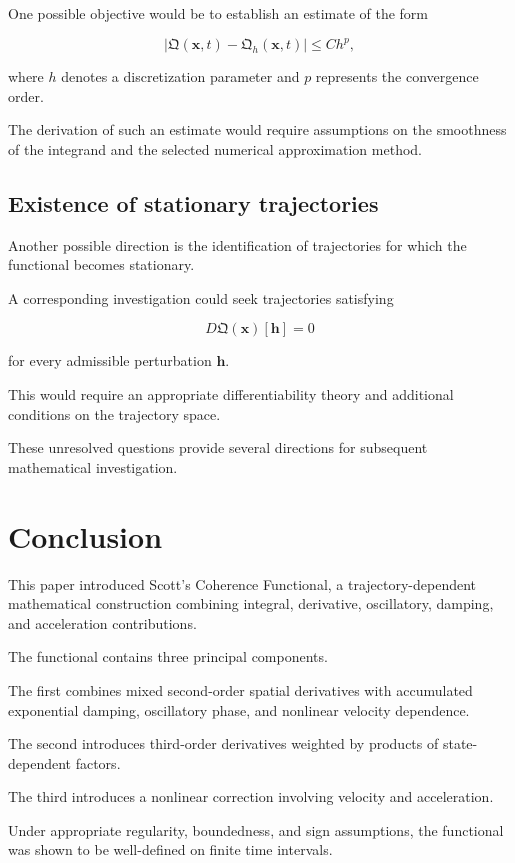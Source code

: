 \documentclass[12pt]{article}
\numberwithin{equation}{section}
\newcommand{\Q}{\mathfrak{Q}}
\theoremstyle{definition}
\theoremstyle{remark}
\begin{document}
One possible objective would be to establish
an estimate of the form

\[
|\Q(\mathbf{x},t)-\Q_h(\mathbf{x},t)|
\leq Ch^p,
\]

where \(h\) denotes a discretization
parameter and \(p\) represents the
convergence order.

The derivation of such an estimate would
require assumptions on the smoothness
of the integrand and the selected
numerical approximation method.

\subsection{Existence of stationary trajectories}

Another possible direction is the
identification of trajectories for which
the functional becomes stationary.

A corresponding investigation could seek
trajectories satisfying

\[
D\Q(\mathbf{x})[\mathbf{h}]=0
\]

for every admissible perturbation
\(\mathbf{h}\).

This would require an appropriate
differentiability theory and additional
conditions on the trajectory space.

These unresolved questions provide
several directions for subsequent
mathematical investigation.


\section{Conclusion}

This paper introduced Scott's Coherence
Functional, a trajectory-dependent
mathematical construction combining
integral, derivative, oscillatory,
damping, and acceleration contributions.

The functional contains three principal
components.

The first combines mixed second-order
spatial derivatives with accumulated
exponential damping, oscillatory phase,
and nonlinear velocity dependence.

The second introduces third-order
derivatives weighted by products
of state-dependent factors.

The third introduces a nonlinear
correction involving velocity
and acceleration.

Under appropriate regularity, boundedness,
and sign assumptions, the functional
was shown to be well-defined on finite
time intervals.
\end{document}
